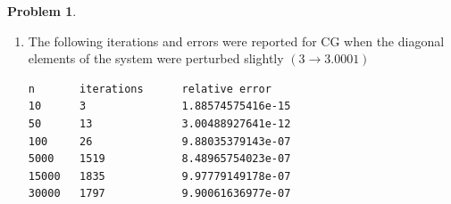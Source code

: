 \documentclass[10pt]{article}
\theoremstyle{definition}
\newtheorem{prob}{Problem}
\begin{document}
\begin{prob}
\begin{enumerate}[\bfseries(a)]
Clearly, CG does not fare well as the size of the system increases. The conjugate gradient method was implemented as follows:
\clearpage
\begin{lstlisting}
def cg(b=None, n=None, mult=None, tol=1e-6):
    """
    non-preconditioned CG
    initial estimate is b (defaults to normalized ones vector)
    size of system n (can be inferred from b or vice versa)     

    using multiplication method mult
    """

    assert mult is not None

    if b is None:
        try:
            # normalize vector of ones
            b = np.ones((n,1)) / np.sqrt(n)
        except NameError:
            raise Exception('must specify system size or initial guess')
    else:
        n = b.size

    # make sure initial guess is a column vector ala matlab
    if b.ndim == 1:
        b = np.expand_dims(b,-1)
    
    # not sure if explicit copy is needed
    x = np.zeros_like(b)
    r = b.copy()
    p = b.copy()
    
    d = mult(p)

    alpha = np.vdot(r,r) / np.vdot(p,d)

    for iterations in count(1):

        x += alpha*p
        r_new = r - alpha*d

        beta = np.vdot(r_new,r_new) / np.vdot(r,r)

        p = r_new + beta*p

        d = mult(p)
    
        alpha = np.vdot(r_new, r_new) / np.vdot(p,d)
        
        r = r_new

        err = norm(mult(x) - b) / norm(b) 

        #print(iterations, err, sep='\t| ')
        if err <= tol:
            break

    return x, iterations, err
\end{lstlisting}

\item The following iterations and errors were reported for CG when the diagonal elements of the system were perturbed slightly $(3 \rightarrow 3.0001)$   
\begin{verbatim}
n		iterations		relative error
10 		3 				1.88574575416e-15
50 		13 				3.00488927641e-12
100 	26 				9.88035379143e-07
5000 	1519 			8.48965754023e-07
15000 	1835 			9.97779149178e-07
30000 	1797 			9.90061636977e-07
\end{verbatim}


\end{enumerate}
\end{prob}
\end{document}
